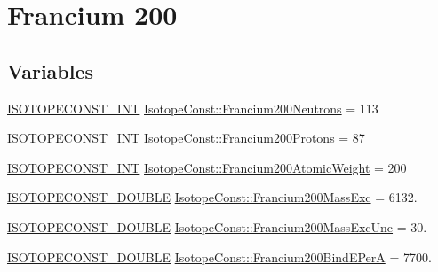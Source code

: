 \hypertarget{group___isotope_const-_francium-_fr200}{}\section{Francium 200}
\label{group___isotope_const-_francium-_fr200}
\subsection*{Variables}
\begin{DoxyCompactItemize}
\item 
\mbox{\hyperlink{group___isotope_const-_macros_ga5f18360b3e99483a35c32d789e62621c}{I\+S\+O\+T\+O\+P\+E\+C\+O\+N\+S\+T\+\_\+\+I\+NT}} \mbox{\hyperlink{group___isotope_const-_francium-_fr200_gae8903fd08e2188f3dbf8c76d46d59919}{Isotope\+Const\+::\+Francium200\+Neutrons}} = 113
\item 
\mbox{\hyperlink{group___isotope_const-_macros_ga5f18360b3e99483a35c32d789e62621c}{I\+S\+O\+T\+O\+P\+E\+C\+O\+N\+S\+T\+\_\+\+I\+NT}} \mbox{\hyperlink{group___isotope_const-_francium-_fr200_gad58453437e0e7631fad7127e9960669c}{Isotope\+Const\+::\+Francium200\+Protons}} = 87
\item 
\mbox{\hyperlink{group___isotope_const-_macros_ga5f18360b3e99483a35c32d789e62621c}{I\+S\+O\+T\+O\+P\+E\+C\+O\+N\+S\+T\+\_\+\+I\+NT}} \mbox{\hyperlink{group___isotope_const-_francium-_fr200_ga09a0163c1372da0ae34b962f476fe0a6}{Isotope\+Const\+::\+Francium200\+Atomic\+Weight}} = 200
\item 
\mbox{\hyperlink{group___isotope_const-_macros_ga8f45a7272ce02c0b4c65c44636ed719a}{I\+S\+O\+T\+O\+P\+E\+C\+O\+N\+S\+T\+\_\+\+D\+O\+U\+B\+LE}} \mbox{\hyperlink{group___isotope_const-_francium-_fr200_gac64ce48da6687314b5fdafd8c34c0d86}{Isotope\+Const\+::\+Francium200\+Mass\+Exc}} = 6132.
\item 
\mbox{\hyperlink{group___isotope_const-_macros_ga8f45a7272ce02c0b4c65c44636ed719a}{I\+S\+O\+T\+O\+P\+E\+C\+O\+N\+S\+T\+\_\+\+D\+O\+U\+B\+LE}} \mbox{\hyperlink{group___isotope_const-_francium-_fr200_gacf0a8ca7e52bace12f6cbce2523c4af0}{Isotope\+Const\+::\+Francium200\+Mass\+Exc\+Unc}} = 30.
\item 
\mbox{\hyperlink{group___isotope_const-_macros_ga8f45a7272ce02c0b4c65c44636ed719a}{I\+S\+O\+T\+O\+P\+E\+C\+O\+N\+S\+T\+\_\+\+D\+O\+U\+B\+LE}} \mbox{\hyperlink{group___isotope_const-_francium-_fr200_gad8c180a6cfce09badce79ee2aed384ae}{Isotope\+Const\+::\+Francium200\+Bind\+E\+PerA}} = 7700.
\item 

\end{DoxyCompactItemize}
